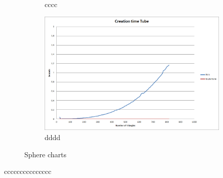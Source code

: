 \documentclass[11pt,twoside,a4paper]{report}
\begin{document}
\begin{figure}[h]
\begin{subfigure}[h]{0.49\textwidth}
	\caption{cccc} \label{fig:gull} \end{subfigure}
    \begin{subfigure}[h]{0.49\textwidth}
	\includegraphics[width=\textwidth]{images/chart_tube_creation_time}
    \caption{dddd} \label{fig:tiger} \end{subfigure}
    \caption{Sphere charts}\label{fig:animals}
\end{figure}

ccccccccccccccc
\end{document}
